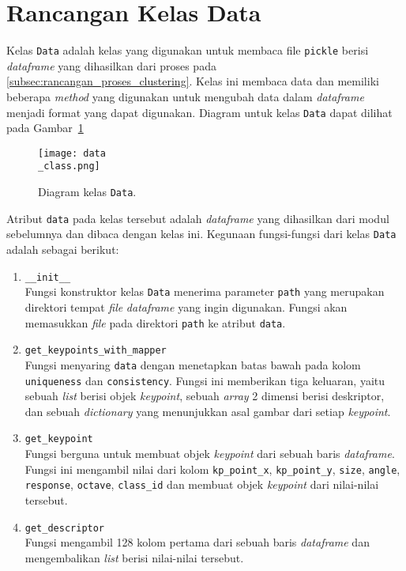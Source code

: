\section{Rancangan Kelas Data}
\label{sec:data_class}
Kelas \texttt{Data} adalah kelas yang digunakan untuk membaca file \texttt{pickle} berisi \textit{dataframe} yang dihasilkan dari proses pada \ref{subsec:rancangan_proses_clustering}. Kelas ini membaca data dan memiliki beberapa \textit{method} yang digunakan untuk mengubah data dalam \textit{dataframe} menjadi format yang dapat digunakan. Diagram untuk kelas \texttt{Data} dapat dilihat pada Gambar~\ref{fig:data_class}
\begin{figure}[H]
	\centering
	\texttt{[image: data\\\_class.png]}
	\caption{Diagram kelas \texttt{Data}.}
	\label{fig:data_class}
\end{figure}
Atribut \texttt{data} pada kelas tersebut adalah \textit{dataframe} yang dihasilkan dari modul sebelumnya dan dibaca dengan kelas ini. Kegunaan fungsi-fungsi dari kelas \texttt{Data} adalah sebagai berikut:
\begin{enumerate}
	\item \texttt{\_\_init\_\_} \\
	Fungsi konstruktor kelas \texttt{Data} menerima parameter \texttt{path} yang merupakan direktori tempat \textit{file} \textit{dataframe} yang ingin digunakan. Fungsi akan memasukkan \textit{file} pada direktori \texttt{path} ke atribut \texttt{data}.
	\item \texttt{get\_keypoints\_with\_mapper} \\
	Fungsi menyaring \texttt{data} dengan menetapkan batas bawah pada kolom \texttt{uniqueness} dan \texttt{consistency}. Fungsi ini memberikan tiga keluaran, yaitu sebuah \textit{list} berisi objek \textit{keypoint}, sebuah \textit{array} 2 dimensi berisi deskriptor, dan sebuah \textit{dictionary} yang menunjukkan asal gambar dari setiap \textit{keypoint}.
	\item \texttt{get\_keypoint} \\
	Fungsi berguna untuk membuat objek \textit{keypoint} dari sebuah baris \textit{dataframe}. Fungsi ini mengambil nilai dari kolom \texttt{kp\_point\_x}, \texttt{kp\_point\_y}, \texttt{size}, \texttt{angle}, \texttt{response}, \texttt{octave}, \texttt{class\_id} dan membuat objek \textit{keypoint} dari nilai-nilai tersebut.
	\item \texttt{get\_descriptor} \\
	Fungsi mengambil 128 kolom pertama dari sebuah baris \textit{dataframe} dan mengembalikan \textit{list} berisi nilai-nilai tersebut.
\end{enumerate}

